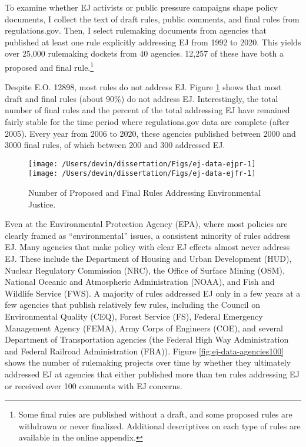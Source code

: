 \documentclass[
      12pt,
        ]{article}
\begin{document}
To examine whether EJ activists or public pressure campaigns shape policy documents,
I collect the text of draft rules, public comments, and final rules from regulations.gov. Then, I select rulemaking documents from agencies that published at least one rule explicitly addressing EJ from 1992 to 2020. This yields over 25,000 rulemaking dockets from 40 agencies. 12,257 of these have both a proposed and final rule.\footnote{Some final rules are published without a draft, and some proposed rules are withdrawn or never finalized. Additional descriptives on each type of rules are available in the online appendix.}

Despite E.O. 12898, most rules do not address EJ. Figure \ref{fig:ej-data} shows that most draft and final rules (about 90\%) do not address EJ. Interestingly, the total number of final rules and the percent of the total addressing EJ have remained fairly stable for the time period where regulations.gov data are complete (after 2005). Every year from 2006 to 2020, these agencies published between 2000 and 3000 final rules, of which between 200 and 300 addressed EJ.

\begin{figure}

{\centering \texttt{[image: /Users/devin/dissertation/Figs/ej-data-ejpr-1]} \texttt{[image: /Users/devin/dissertation/Figs/ej-data-ejfr-1]} 

}

\caption{Number of Proposed and Final Rules Addressing Environmental Justice.}\label{fig:ej-data}
\end{figure}

Even at the Environmental Protection Agency (EPA), where most policies are clearly framed as ``environmental'' issues, a consistent minority of rules address EJ. Many agencies that make policy with clear EJ effects almost never address EJ. These include the Department of Housing and Urban Development (HUD), Nuclear Regulatory Commission (NRC), the Office of Surface Mining (OSM), National Oceanic and Atmospheric Administration (NOAA), and Fish and Wildlife Service (FWS). A majority of rules addressed EJ only in a few years at a few agencies that publish relatively few rules, including the Council on Environmental Quality (CEQ), Forest Service (FS), Federal Emergency Management Agency (FEMA), Army Corps of Engineers (COE), and several Department of Transportation agencies (the Federal High Way Administration and Federal Railroad Administration (FRA)). Figure \ref{fig:ej-data-agencies100} shows the number of rulemaking projects over time by whether they ultimately addressed EJ at agencies that either published more than ten rules addressing EJ or received over 100 comments with EJ concerns.
\end{document}
